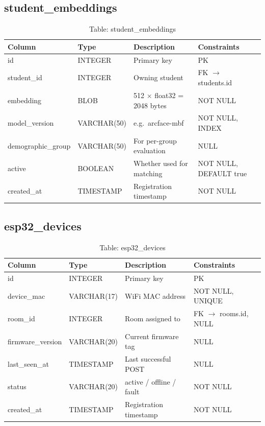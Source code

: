 \documentclass[12pt,a4paper]{report}
\begin{document}
\subsection{student\_embeddings}
\begin{table}[H]
\centering\small
\caption{Table: student\_embeddings}
\begin{tabularx}{\linewidth}{llXl}
\toprule
\textbf{Column} & \textbf{Type} & \textbf{Description} & \textbf{Constraints} \\
\midrule
id                 & INTEGER     & Primary key                          & PK \\
student\_id        & INTEGER     & Owning student                       & FK $\to$ students.id \\
embedding          & BLOB        & 512 $\times$ float32 = 2048 bytes    & NOT NULL \\
model\_version     & VARCHAR(50) & e.g.\ arcface-mbf                    & NOT NULL, INDEX \\
demographic\_group & VARCHAR(50) & For per-group evaluation             & NULL \\
active             & BOOLEAN     & Whether used for matching            & NOT NULL, DEFAULT true \\
created\_at        & TIMESTAMP   & Registration timestamp               & NOT NULL \\
\bottomrule
\end{tabularx}
\end{table}

\subsection{esp32\_devices}
\begin{table}[H]
\centering\small
\caption{Table: esp32\_devices}
\begin{tabularx}{\linewidth}{llXl}
\toprule
\textbf{Column} & \textbf{Type} & \textbf{Description} & \textbf{Constraints} \\
\midrule
id                & INTEGER      & Primary key              & PK \\
device\_mac       & VARCHAR(17)  & WiFi MAC address         & NOT NULL, UNIQUE \\
room\_id          & INTEGER      & Room assigned to         & FK $\to$ rooms.id, NULL \\
firmware\_version & VARCHAR(20)  & Current firmware tag     & NULL \\
last\_seen\_at    & TIMESTAMP    & Last successful POST     & NULL \\
status            & VARCHAR(20)  & active / offline / fault & NOT NULL \\
created\_at       & TIMESTAMP    & Registration timestamp   & NOT NULL \\
\bottomrule
\end{tabularx}
\end{table}
\end{document}
